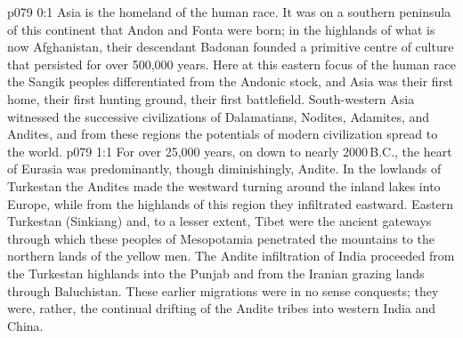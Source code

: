 \author{Archangel}
\vs p079 0:1 Asia is the homeland of the human race. It was on a southern peninsula of this continent that Andon and Fonta were born; in the highlands of what is now Afghanistan, their descendant Badonan founded a primitive centre of culture that persisted for over 500,000 years. Here at this eastern focus of the human race the Sangik peoples differentiated from the Andonic stock, and Asia was their first home, their first hunting ground, their first battlefield. South\hyp{}western Asia witnessed the successive civilizations of Dalamatians, Nodites, Adamites, and Andites, and from these regions the potentials of modern civilization spread to the world.
\vs p079 1:1 For over 25,000 years, on down to nearly 2000\,B.C., the heart of Eurasia was predominantly, though diminishingly, Andite. In the lowlands of Turkestan the Andites made the westward turning around the inland lakes into Europe, while from the highlands of this region they infiltrated eastward. Eastern Turkestan (Sinkiang) and, to a lesser extent, Tibet were the ancient gateways through which these peoples of Mesopotamia penetrated the mountains to the northern lands of the yellow men. The Andite infiltration of India proceeded from the Turkestan highlands into the Punjab and from the Iranian grazing lands through Baluchistan. These earlier migrations were in no sense conquests; they were, rather, the continual drifting of the Andite tribes into western India and China.
